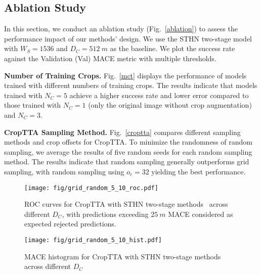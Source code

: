 
\vspace{-20pt}
\subsection{Ablation Study}\label{sec:ablation}
In this section, we conduct an ablation study (Fig.~\ref{ablation}) to assess the performance impact of our methods' design. We use the STHN two-stage model~\cite{STHN} with $W_S=1536$ and $D_C=512~\si{m}$ as the baseline. We plot the success rate against the Validation (Val) MACE metric with multiple thresholds. 



\textbf{Number of Training Crops.} Fig.~\ref{mct} displays the performance of models trained with different numbers of training crops. The results indicate that models trained with $N_C=5$ achieve a higher success rate and lower error compared to those trained with $N_C=1$ (only the original image without crop augmentation) and $N_C=3$.


\textbf{CropTTA Sampling Method.} Fig.~\ref{croptta} compares different sampling methods and crop offsets for CropTTA. To minimize the randomness of random sampling, we average the results of five random seeds for each random sampling method. The results indicate that random sampling generally outperforms grid sampling, with random sampling using $o_c = 32$ yielding the best performance.

\begin{figure}
    \centering
\texttt{[image: fig/grid\_random\_5\_10\_roc.pdf]}\vspace{-10pt}
   \caption{ROC curves for CropTTA with STHN two-stage methods~\cite{STHN} across different $D_C$, with predictions exceeding $25~\si{m}$ MACE considered as expected rejected predictions.}\label{roc}
   \vspace{-15pt}
\end{figure}

\begin{figure}
    \centering
\texttt{[image: fig/grid\_random\_5\_10\_hist.pdf]}\vspace{-10pt}
   \caption{MACE histogram for CropTTA with STHN two-stage methods across different $D_C$}\label{hist}
   \vspace{-15pt}
\end{figure}

